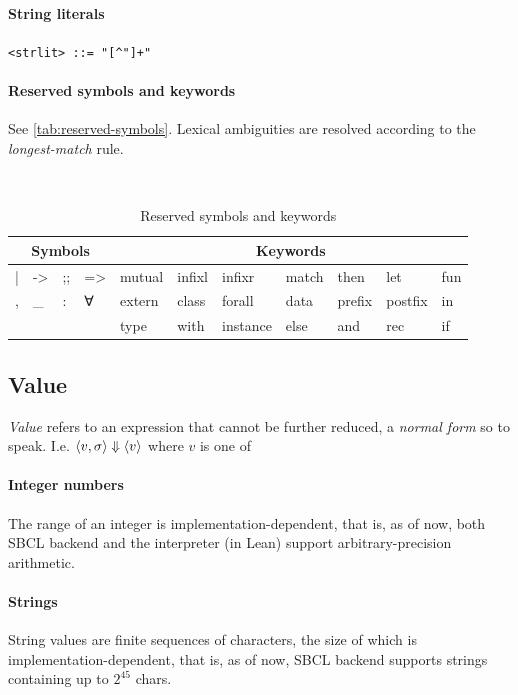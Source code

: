 \documentclass[a4paper, 11pt]{article}
\theoremstyle{remark}\newtheorem*{remark}{Remark}
\theoremstyle{definition}\newtheorem*{definition}{Definition}
\begin{document}
\paragraph{String literals} \texttt{<strlit> ::= "[^"]+"}
\paragraph{Reserved symbols and keywords} See \autoref{tab:reserved-symbols}.
Lexical ambiguities are resolved according to the \emph{longest-match} rule.
\begin{table}[]
  \centering
  {\tt
    \begin{tabular}{@{}lllllllllll@{}}
      \toprule
      \multicolumn{4}{c}{\textrm{Symbols}}                & \multicolumn{7}{c}{\textrm{Keywords}}                                \\ \midrule
      | & -\textgreater{} & ;; & =\textgreater{} & mutual & infixl & infixr   & match & then   & let     & fun \\
      , & \_              & :  & ∀          & extern & class  & forall   & data  & prefix & postfix & in  \\
      &                 &    &                 & type   & with   & instance & else  & and    & rec     & if \\ \bottomrule
  \end{tabular}}
  \caption{Reserved symbols and keywords}\label{tab:reserved-symbols}
\end{table}

\subsection{Value}
\emph{Value} refers to an expression that cannot be further reduced, a \emph{normal form}
so to speak. I.e. \(\langle v, \sigma \rangle \Downarrow \langle v \rangle\) where \(v\) is one of
\paragraph*{Integer numbers} The range of an integer is implementation-dependent, that is,
as of now, both SBCL backend and the interpreter (in Lean) support arbitrary-precision arithmetic.
\paragraph*{Strings} String values are finite sequences of characters, the size of which is
implementation-dependent, that is, as of now,
SBCL backend supports strings containing up to \(2^{45}\) chars.
\end{document}
